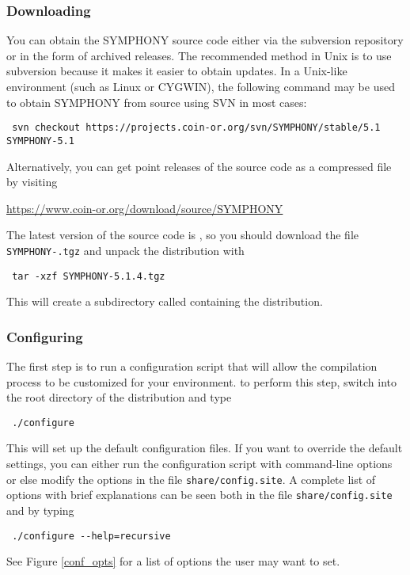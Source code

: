 \subsubsection{Downloading}

You can obtain the SYMPHONY source code either via the subversion repository
or in the form of archived releases. The recommended method in Unix is to use
subversion because it makes it easier to obtain updates. In a Unix-like
environment (such as Linux or CYGWIN), the following command may be used to
obtain SYMPHONY from source using SVN in most cases: {\color{Brown}
\begin{verbatim}
 svn checkout https://projects.coin-or.org/svn/SYMPHONY/stable/5.1 SYMPHONY-5.1
\end{verbatim}
}
Alternatively, you can get point releases of the source code as a compressed
file by visiting
\begin{center}
 \url{https://www.coin-or.org/download/source/SYMPHONY}
\end{center}
The latest version of the source code is \VER, so you should download the file
{\color{Brown}\texttt{SYMPHONY-\VER.tgz}} and unpack the distribution with 
{\color{Brown}
\begin{verbatim}
 tar -xzf SYMPHONY-5.1.4.tgz
\end{verbatim}
} 
This will create a subdirectory called  containing
the distribution.

\subsubsection{Configuring}\label{configuring}

The first step is to run a configuration script that will allow the
compilation process to be customized for your environment. to perform this
step, switch into the root directory of the distribution and type
{\color{Brown}
\begin{verbatim}
 ./configure 
\end{verbatim}
} This will set up the default configuration files. If you want to override
the default settings, you can either run the configuration script with
command-line options or else modify the options in the file
{\color{Brown}\texttt{share/config.site}}. A complete list of options with
brief explanations can be seen both in the file
{\color{Brown}\texttt{share/config.site}} and by typing 
{\color{Brown}
\begin{verbatim}
 ./configure --help=recursive 
\end{verbatim}
}
See Figure \ref{conf_opts} for a list of options the user may want to set. 

